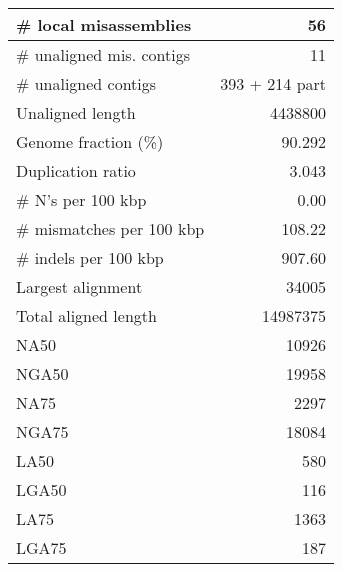 \documentclass[12pt,a4paper]{article}
\begin{document}
\begin{table}[ht]
\begin{center}
\begin{tabular}{|l*{1}{|r}|}
\# local misassemblies & 56 \\ \hline
\# unaligned mis. contigs & 11 \\ \hline
\# unaligned contigs & 393 + 214 part \\ \hline
Unaligned length & 4438800 \\ \hline
Genome fraction (\%) & 90.292 \\ \hline
Duplication ratio & 3.043 \\ \hline
\# N's per 100 kbp & 0.00 \\ \hline
\# mismatches per 100 kbp & 108.22 \\ \hline
\# indels per 100 kbp & 907.60 \\ \hline
Largest alignment & 34005 \\ \hline
Total aligned length & 14987375 \\ \hline
NA50 & 10926 \\ \hline
NGA50 & 19958 \\ \hline
NA75 & 2297 \\ \hline
NGA75 & 18084 \\ \hline
LA50 & 580 \\ \hline
LGA50 & 116 \\ \hline
LA75 & 1363 \\ \hline
LGA75 & 187 \\ \hline
\end{tabular}
\end{center}
\end{table}
\end{document}
